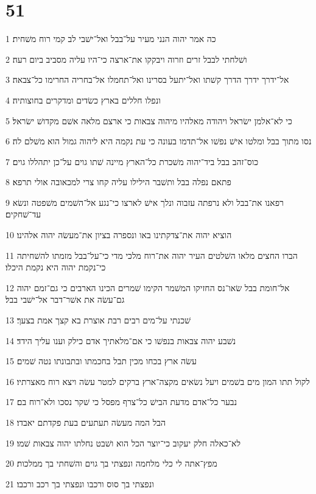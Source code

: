 \chapter{51}

\par 1 כה אמר יהוה הנני מעיר על־בבל ואל־ישׁבי לב קמי רוח משׁחית׃
\par 2 ושׁלחתי לבבל זרים וזרוה ויבקקו את־ארצה כי־היו עליה מסביב ביום רעה׃
\par 3 אל־ידרך ידרך הדרך קשׁתו ואל־יתעל בסרינו ואל־תחמלו אל־בחריה החרימו כל־צבאה׃
\par 4 ונפלו חללים בארץ כשׂדים ומדקרים בחוצותיה׃
\par 5 כי לא־אלמן ישׂראל ויהודה מאלהיו מיהוה צבאות כי ארצם מלאה אשׁם מקדושׁ ישׂראל׃
\par 6 נסו מתוך בבל ומלטו אישׁ נפשׁו אל־תדמו בעונה כי עת נקמה היא ליהוה גמול הוא משׁלם לה׃
\par 7 כוס־זהב בבל ביד־יהוה משׁכרת כל־הארץ מיינה שׁתו גוים על־כן יתהללו גוים׃
\par 8 פתאם נפלה בבל ותשׁבר הילילו עליה קחו צרי למכאובה אולי תרפא׃
\par 9 רפאנו את־בבל ולא נרפתה עזבוה ונלך אישׁ לארצו כי־נגע אל־השׁמים משׁפטה ונשׂא עד־שׁחקים׃
\par 10 הוציא יהוה את־צדקתינו באו ונספרה בציון את־מעשׂה יהוה אלהינו׃
\par 11 הברו החצים מלאו השׁלטים העיר יהוה את־רוח מלכי מדי כי־על־בבל מזמתו להשׁחיתה כי־נקמת יהוה היא נקמת היכלו׃
\par 12 אל־חומת בבל שׂאו־נס החזיקו המשׁמר הקימו שׁמרים הכינו הארבים כי גם־זמם יהוה גם־עשׂה את אשׁר־דבר אל־ישׁבי בבל׃
\par 13 שׁכנתי על־מים רבים רבת אוצרת בא קצך אמת בצעך׃
\par 14 נשׁבע יהוה צבאות בנפשׁו כי אם־מלאתיך אדם כילק וענו עליך הידד׃
\par 15 עשׂה ארץ בכחו מכין תבל בחכמתו ובתבונתו נטה שׁמים׃
\par 16 לקול תתו המון מים בשׁמים ויעל נשׂאים מקצה־ארץ ברקים למטר עשׂה ויצא רוח מאצרתיו׃
\par 17 נבער כל־אדם מדעת הבישׁ כל־צרף מפסל כי שׁקר נסכו ולא־רוח בם׃
\par 18 הבל המה מעשׂה תעתעים בעת פקדתם יאבדו׃
\par 19 לא־כאלה חלק יעקוב כי־יוצר הכל הוא ושׁבט נחלתו יהוה צבאות שׁמו׃
\par 20 מפץ־אתה לי כלי מלחמה ונפצתי בך גוים והשׁחתי בך ממלכות׃
\par 21 ונפצתי בך סוס ורכבו ונפצתי בך רכב ורכבו׃

